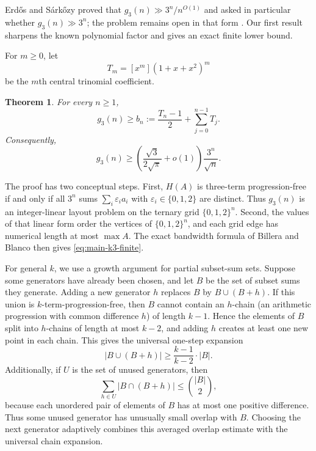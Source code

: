 \documentclass[11pt]{article}
\numberwithin{equation}{section}
\newtheorem{theorem}{Theorem}[section]
\theoremstyle{definition}
\theoremstyle{remark}
\newcommand{\eps}{\varepsilon}
\begin{document}
\bigskip
\noindent
Erd\H{o}s and S\'ark\H{o}zy proved that $g_3(n)\gg3^n/n^{O(1)}$ and asked in particular whether $g_3(n)\gg3^n$; the problem remains open in that form \cite{ErdosSarkozy1992,Bloom817}. Our first result sharpens the known polynomial factor and gives an exact finite lower bound.

\bigskip
\noindent
For $m\ge0$, let
\begin{equation}\label{eq:central-trinomial}
T_m=[x^m](1+x+x^2)^m
\end{equation}
be the $m$th central trinomial coefficient.

\begin{theorem}\label{thm:main-k3}
For every $n\ge1$,
\begin{equation}\label{eq:main-k3-finite}
g_3(n)\ge b_n:=\frac{T_n-1}{2}+\sum_{j=0}^{n-1}T_j.
\end{equation}
Consequently,
\begin{equation}\label{eq:main-k3-asymptotic}
g_3(n)\ge \left(\frac{\sqrt{3}}{2\sqrt{\pi}}+o(1)\right)\frac{3^n}{\sqrt{n}}.
\end{equation}
\end{theorem}

\smallskip
\noindent
The proof has two conceptual steps. First, $H(A)$ is three-term progression-free if and only if all $3^n$ sums $\sum_i\eps_i a_i$ with $\eps_i\in\{0,1,2\}$ are distinct. Thus $g_3(n)$ is an integer-linear layout problem on the ternary grid $\{0, 1, 2\}^n$. Second, the values of that linear form order the vertices of $\{0,1,2\}^n$, and each grid edge has numerical length at most $\max A$. The exact bandwidth formula of Billera and Blanco \cite{BilleraBlanco2013} then gives \eqref{eq:main-k3-finite}. 

\bigskip
\noindent
For general $k$, we use a growth argument for partial subset-sum sets. Suppose some generators have already been chosen, and let $B$ be the set of subset sums they generate. Adding a new generator $h$ replaces $B$ by $B\cup(B+h)$.  If this union is $k$-term-progression-free, then $B$ cannot contain an $h$-chain (an arithmetic progression with common difference $h$) of length $k-1$.  Hence the elements of $B$ split into $h$-chains of length at most $k-2$, and adding $h$ creates at least one new point in each chain. This gives the universal one-step expansion
\[
|B\cup(B+h)|\ge \frac{k-1}{k-2}\cdot|B|.
\]
Additionally, if $U$ is the set of unused generators, then
\[
\sum_{h\in U}|B\cap(B+h)|\le \binom{|B|}{2},
\]
because each unordered pair of elements of $B$ has at most one positive difference. Thus some unused generator has unusually small overlap with $B$. Choosing the next generator adaptively combines this averaged overlap estimate with the universal chain expansion.
\end{document}

